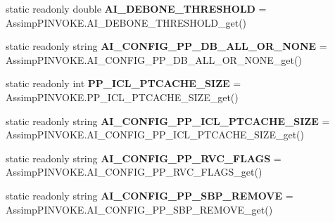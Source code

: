 \begin{DoxyCompactItemize}
\item 
\hypertarget{class_assimp_a7f475e9f7a63991196ee524f262ad0e1}{static readonly double {\bfseries A\+I\+\_\+\+D\+E\+B\+O\+N\+E\+\_\+\+T\+H\+R\+E\+S\+H\+O\+L\+D} = Assimp\+P\+I\+N\+V\+O\+K\+E.\+A\+I\+\_\+\+D\+E\+B\+O\+N\+E\+\_\+\+T\+H\+R\+E\+S\+H\+O\+L\+D\+\_\+get()}\label{class_assimp_a7f475e9f7a63991196ee524f262ad0e1}

\item 
\hypertarget{class_assimp_a0eafef11658ae3c9d7e1c19ed95f83bd}{static readonly string {\bfseries A\+I\+\_\+\+C\+O\+N\+F\+I\+G\+\_\+\+P\+P\+\_\+\+D\+B\+\_\+\+A\+L\+L\+\_\+\+O\+R\+\_\+\+N\+O\+N\+E} = Assimp\+P\+I\+N\+V\+O\+K\+E.\+A\+I\+\_\+\+C\+O\+N\+F\+I\+G\+\_\+\+P\+P\+\_\+\+D\+B\+\_\+\+A\+L\+L\+\_\+\+O\+R\+\_\+\+N\+O\+N\+E\+\_\+get()}\label{class_assimp_a0eafef11658ae3c9d7e1c19ed95f83bd}

\item 
\hypertarget{class_assimp_a3790e2b77bbc1317ecdd7386e601c180}{static readonly int {\bfseries P\+P\+\_\+\+I\+C\+L\+\_\+\+P\+T\+C\+A\+C\+H\+E\+\_\+\+S\+I\+Z\+E} = Assimp\+P\+I\+N\+V\+O\+K\+E.\+P\+P\+\_\+\+I\+C\+L\+\_\+\+P\+T\+C\+A\+C\+H\+E\+\_\+\+S\+I\+Z\+E\+\_\+get()}\label{class_assimp_a3790e2b77bbc1317ecdd7386e601c180}

\item 
\hypertarget{class_assimp_ab33f2e349f9420956d9c947381508150}{static readonly string {\bfseries A\+I\+\_\+\+C\+O\+N\+F\+I\+G\+\_\+\+P\+P\+\_\+\+I\+C\+L\+\_\+\+P\+T\+C\+A\+C\+H\+E\+\_\+\+S\+I\+Z\+E} = Assimp\+P\+I\+N\+V\+O\+K\+E.\+A\+I\+\_\+\+C\+O\+N\+F\+I\+G\+\_\+\+P\+P\+\_\+\+I\+C\+L\+\_\+\+P\+T\+C\+A\+C\+H\+E\+\_\+\+S\+I\+Z\+E\+\_\+get()}\label{class_assimp_ab33f2e349f9420956d9c947381508150}

\item 
\hypertarget{class_assimp_ab28ac5e789effbd68d814ee6f88a9c0d}{static readonly string {\bfseries A\+I\+\_\+\+C\+O\+N\+F\+I\+G\+\_\+\+P\+P\+\_\+\+R\+V\+C\+\_\+\+F\+L\+A\+G\+S} = Assimp\+P\+I\+N\+V\+O\+K\+E.\+A\+I\+\_\+\+C\+O\+N\+F\+I\+G\+\_\+\+P\+P\+\_\+\+R\+V\+C\+\_\+\+F\+L\+A\+G\+S\+\_\+get()}\label{class_assimp_ab28ac5e789effbd68d814ee6f88a9c0d}

\item 
\hypertarget{class_assimp_a74e3ff01afdc300251da2079273cfa0c}{static readonly string {\bfseries A\+I\+\_\+\+C\+O\+N\+F\+I\+G\+\_\+\+P\+P\+\_\+\+S\+B\+P\+\_\+\+R\+E\+M\+O\+V\+E} = Assimp\+P\+I\+N\+V\+O\+K\+E.\+A\+I\+\_\+\+C\+O\+N\+F\+I\+G\+\_\+\+P\+P\+\_\+\+S\+B\+P\+\_\+\+R\+E\+M\+O\+V\+E\+\_\+get()}\label{class_assimp_a74e3ff01afdc300251da2079273cfa0c}


\end{DoxyCompactItemize}
